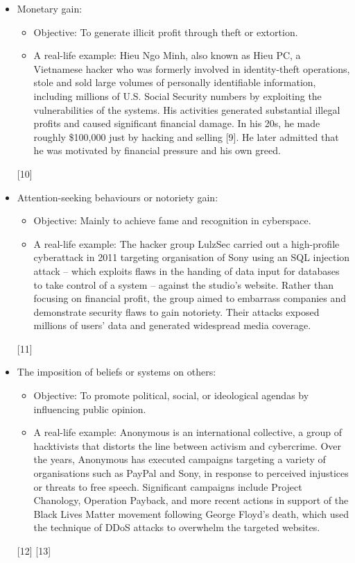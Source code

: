 \begin{itemize}
  \item Monetary gain:
  \begin{itemize}
    \item Objective: To generate illicit profit through theft or extortion.
    \item A real-life example: Hieu Ngo Minh, also known as Hieu PC, a Vietnamese hacker who was formerly involved in identity-theft operations, stole and sold large volumes of personally identifiable information, including millions of U.S. Social Security numbers by exploiting the vulnerabilities of the systems. His activities generated substantial illegal profits and caused significant financial damage. In his 20s, he made roughly \$100,000 just by hacking and selling [9]. He later admitted that he was motivated by financial pressure and his own greed.
  \end{itemize}
  [10]

  \item Attention-seeking behaviours or notoriety gain:
  \begin{itemize}
    \item Objective: Mainly to achieve fame and recognition in cyberspace.
    \item A real-life example: The hacker group LulzSec carried out a high-profile cyberattack in 2011 targeting organisation of Sony using an SQL injection attack – which exploits flaws in the handing of data input for databases to take control of a system – against the studio's website. Rather than focusing on financial profit, the group aimed to embarrass companies and demonstrate security flaws to gain notoriety. Their attacks exposed millions of users' data and generated widespread media coverage.
  \end{itemize}
  [11]

  \item The imposition of beliefs or systems on others:
  \begin{itemize}
    \item Objective: To promote political, social, or ideological agendas by influencing public opinion.
    \item A real-life example: Anonymous is an international collective, a group of hacktivists that distorts the line between activism and cybercrime. Over the years, Anonymous has executed campaigns targeting a variety of organisations such as PayPal and Sony, in response to perceived injustices or threats to free speech. Significant campaigns include Project Chanology, Operation Payback, and more recent actions in support of the Black Lives Matter movement following George Floyd's death, which used the technique of DDoS attacks to overwhelm the targeted websites.
  \end{itemize}
  [12] [13]


\end{itemize}
